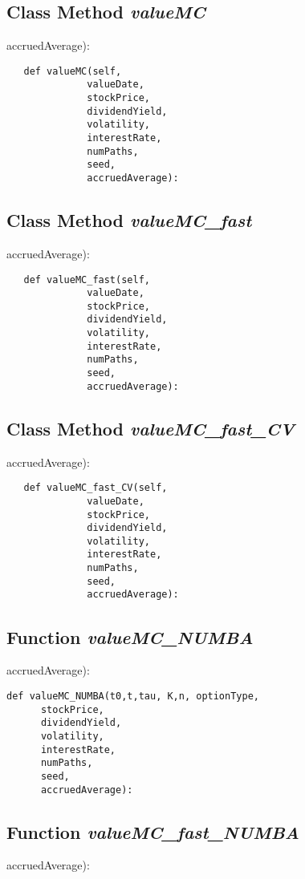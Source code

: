 \documentclass[twoside,11pt]{book}
\begin{document}
\subsection{Class Method {\it valueMC}}
accruedAverage):

\begin{lstlisting}
   def valueMC(self,
              valueDate,
              stockPrice,
              dividendYield,
              volatility,
              interestRate,
              numPaths,
              seed,
              accruedAverage):
\end{lstlisting}

\subsection{Class Method {\it valueMC\_fast}}
accruedAverage):

\begin{lstlisting}
   def valueMC_fast(self,
              valueDate,
              stockPrice,
              dividendYield,
              volatility,
              interestRate,
              numPaths,
              seed,
              accruedAverage):
\end{lstlisting}

\subsection{Class Method {\it valueMC\_fast\_CV}}
accruedAverage):

\begin{lstlisting}
   def valueMC_fast_CV(self,
              valueDate,
              stockPrice,
              dividendYield,
              volatility,
              interestRate,
              numPaths,
              seed,
              accruedAverage):
\end{lstlisting}

\subsection{Function {\it valueMC\_NUMBA}}
accruedAverage):

\begin{lstlisting}
def valueMC_NUMBA(t0,t,tau, K,n, optionType,
      stockPrice,
      dividendYield,
      volatility,
      interestRate,
      numPaths,
      seed,
      accruedAverage):
\end{lstlisting}

\subsection{Function {\it valueMC\_fast\_NUMBA}}
accruedAverage):
\end{document}
